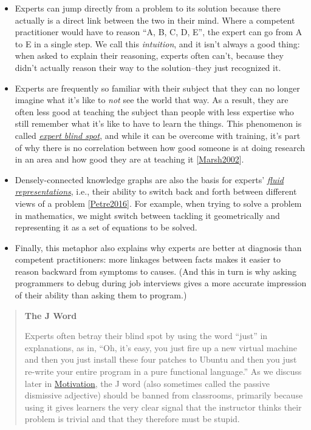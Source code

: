 \documentclass[10pt,statementpaper]{memoir}
\begin{document}
\begin{itemize}
\item
  Experts can jump directly from a problem to its solution because there
  actually is a direct link between the two in their mind. Where a
  competent practitioner would have to reason ``A, B, C, D, E'', the
  expert can go from A to E in a single step. We call this
  \emph{intuition}, and it isn't always a good thing: when asked to
  explain their reasoning, experts often can't, because they didn't
  actually reason their way to the solution--they just recognized it.
\item
  Experts are frequently so familiar with their subject that they can no
  longer imagine what it's like to \emph{not} see the world that way. As
  a result, they are often less good at teaching the subject than people
  with less expertise who still remember what it's like to have to learn
  the things. This phenomenon is called
  \emph{\href{gloss.html\#expert-blind-spot}{expert blind spot}}, and
  while it can be overcome with training, it's part of why there is no
  correlation between how good someone is at doing research in an area
  and how good they are at teaching it
  {[}\href{biblio.html\#marsh-hattie-teaching}{Marsh2002}{]}.
\item
  Densely-connected knowledge graphs are also the basis for experts'
  \emph{\href{gloss.html\#fluid-representation}{fluid representations}},
  i.e., their ability to switch back and forth between different views
  of a problem {[}\href{biblio.html\#petre-expertise}{Petre2016}{]}. For
  example, when trying to solve a problem in mathematics, we might
  switch between tackling it geometrically and representing it as a set
  of equations to be solved.
\item
  Finally, this metaphor also explains why experts are better at
  diagnosis than competent practitioners: more linkages between facts
  makes it easier to reason backward from symptoms to causes. (And this
  in turn is why asking programmers to debug during job interviews gives
  a more accurate impression of their ability than asking them to
  program.)
\end{itemize}

\begin{quote}
\textbf{The J Word}

Experts often betray their blind spot by using the word ``just'' in
explanations, as in, ``Oh, it's easy, you just fire up a new virtual
machine and then you just install these four patches to Ubuntu and then
you just re-write your entire program in a pure functional language.''
As we discuss later in \href{motivation.html}{Motivation}, the J word
(also sometimes called the passive dismissive adjective) should be
banned from classrooms, primarily because using it gives learners the
very clear signal that the instructor thinks their problem is trivial
and that they therefore must be stupid.
\end{quote}
\end{document}
